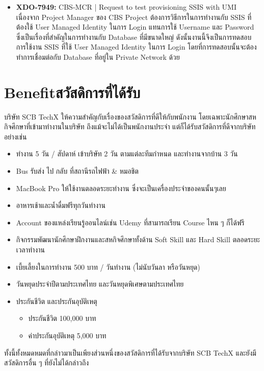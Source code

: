 \begin{itemize}
      \item \textbf{XDO-7949:} CBS-MCR | Request to test provisioning SSIS with UMI\\
            เนื่องจาก Project Manager ของ CBS Project ต้องการวิธีการในการทำงานกับ SSIS ที่ต้องใช้ User Managed Identity ในการ Login แทนการใช้ Username และ Password ซึ่งเป็นเรื่องที่สำคัญในการทำงานกับ Database ที่มีขนาดใหญ่ ดังนั้นงานนี้จึงเป็นการทดสอบการใช้งาน SSIS ที่ใช้ User Managed Identity ในการ Login โดยที่การทดสอบนั้นจะต้องทำการเชื่อมต่อกับ Database ที่อยู่ใน Private Network ด้วย
\end{itemize}

\section{\ifenglish Benefit\else สวัสดิการที่ได้รับ\fi}
บริษัท SCB TechX ให้ความสำคัญกับเรื่องของสวัสดิการที่ดีให้กับพนักงาน โดยเฉพาะนักศึกษาสหกิจศึกษาที่เข้ามาทำงานในบริษัท
ถึงแม้จะไม่ได้เป็นพนักงานประจำ แต่ก็ได้รับสวัสดิการที่ดีจากบริษัทอย่างเช่น
\begin{itemize}
      \item ทำงาน 5 วัน / สัปดาห์ เข้าบริษัท 2 วัน ตามแต่ละทีมกำหนด และทำงานจากบ้าน 3 วัน
      \item Bus รับส่ง ไป กลับ ที่สถานีรถไฟฟ้า \& หมอชิต
      \item MacBook Pro ให้ใช้งานตลอดระยะทำงาน ซึ่งจะเป็นเครื่องประจำของคนนั้นๆเลย
      \item อาหารเช้าและน้ำดื่มฟรีทุกวันทำงาน
      \item Account ของแหล่งเรียนรู้ออนไลน์เช่น Udemy ที่สามารถเรียน Course ไหน ๆ ก็ได้ฟรี
      \item กิจกรรมพัฒนานักศึกษาฝึกงานและสหกิจศึกษาทั้งด้าน Soft Skill และ Hard Skill ตลอดระยะเวลาทำงาน
      \item เบี้ยเลี้ยงในการทำงาน 500 บาท / วันทำงาน (ไม่นับวันลา หรือวันหยุด)
      \item วันหยุดประจำปีตามประเทศไทย และวันหยุดพิเศษตามประเทศไทย
      \item ประกันชีวิต และประกันอุบัติเหตุ
            \begin{itemize}
                  \item ประกันชีวิต 100,000 บาท
                  \item ค่าประกันอุบัติเหตุ 5,000 บาท
            \end{itemize}
\end{itemize}
ทั้งนี้ทั้งหมดหมดที่กล่าวมาเป็นเพียงส่วนหนึ่งของสวัสดิการที่ได้รับจากบริษัท SCB TechX และยังมีสวัสดิการอื่น ๆ ที่ยังไม่ได้กล่าวถึง

